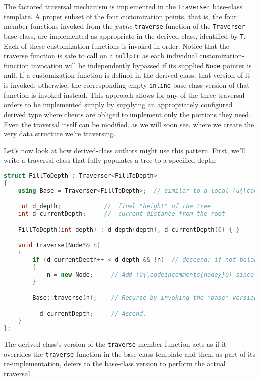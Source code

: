 \noindent The factored traversal mechanism is implemented in the
\texttt{Traverser} base-class template. A proper subset of the four
customization points, that is, the four member functions invoked from
the \emph{public} \texttt{traverse} function of the \texttt{Traverser}
base class, are implemented as appropriate in the derived class,
identified by \texttt{T}. Each of these customization functions is
invoked in order. Notice that the traverse function is safe to call on a
\texttt{nullptr} as each individual customization-function invocation
will be independently bypassed if its supplied \texttt{Node} pointer is
null. If a customization function is defined in the derived class, that
version of it is invoked; otherwise, the corresponding empty
\texttt{inline} base-class version of that function is invoked instead.
This approach allows for any of the three traversal orders to be
implemented simply by supplying an appropriately configured derived type
where clients are obliged to implement only the portions they need. Even
the traversal itself can be modified, as we will soon see, where we
create the very data structure we're traversing.

Let's now look at how derived-class authors might use this pattern.
First, we'll write a traversal class that fully populates a tree to a
specified depth:

\begin{lstlisting}[language=C++]
struct FillToDepth : Traverser<FillToDepth>
{
    using Base = Traverser<FillToDepth>;  // similar to a local (ù{\codeincomments{typedef}}ù)

    int d_depth;            //  final "height" of the tree
    int d_currentDepth;     //  current distance from the root

    FillToDepth(int depth) : d_depth(depth), d_currentDepth(0) { }

    void traverse(Node*& n)
    {
        if (d_currentDepth++ < d_depth && !n)  // descend; if not balanced...
        {
            n = new Node;     // Add (ù{\codeincomments{node}}ù) since it's not already there.
        }

        Base::traverse(n);    // Recurse by invoking the *base* version.

        --d_currentDepth;     // Ascend.
    }
};
\end{lstlisting}
    
\noindent The derived class's version of the \texttt{traverse} member function
acts as if it overrides the \texttt{traverse} function in the base-class
template and then, as part of its re-implementation, defers to the base-class version to perform the actual traversal.

